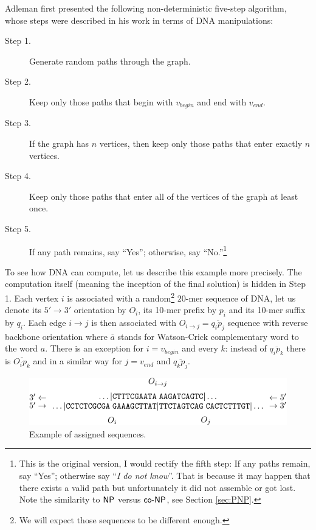 		Adleman first presented the following non-deterministic five-step algorithm, whose steps were described in his work in terms of DNA manipulations:
		\begin{description}
			\item[Step 1.] Generate random paths through the graph.
			\item[Step 2.] Keep only those paths that begin with $v_{begin}$ and end with $v_{end}$.
			\item[Step 3.] If the graph has $n$ vertices, then keep only those paths that enter exactly $n$ vertices.
			\item[Step 4.] Keep only those paths that enter all of the vertices of the graph at least once.
			\item[Step 5.] If any path remains, say ``Yes''; otherwise, say ``No.''\footnote{This is the original version, I would rectify the fifth step: If any paths remain, say ``Yes''; otherwise say ``{\em I do not know}''. That is because it may happen that there exists a valid path but unfortunately it did not assemble or got lost. Note the similarity to $\mathsf{NP}$ versus $\mathsf{co}\textnormal{-}\mathsf{NP}$, see Section \ref{sec:PNP}.} %
		\end{description}
		To see %
		how DNA can compute, let us describe this example more precisely. The computation itself (meaning the inception of the final solution) is hidden in Step 1. Each vertex $i$ is associated with a random\footnote{We will expect those sequences to be different enough.} $20$-mer sequence of DNA, let us denote its $5'\rightarrow 3'$ orientation by $O_i$, its 10-mer prefix by $p_i$ and its 10-mer suffix by $q_i$. Each edge $i\rightarrow j$ is then associated with $O_{i\rightarrow j} = \overline{q_i p_j}$ sequence with reverse backbone orientation where $\overline{a}$ stands for Watson-Crick complementary word to the word $a$. There is an exception for $i=v_{begin}$ and every $k$: instead of $\overline{q_i p_k}$ there is $\overline{O_i p_k}$ and in a similar way for $j=v_{end}$ and $\overline{q_k p_j}$.
		
		\begin{figure}[H]
		\begin{center}
			\includegraphics{./figures/adleman_strands.pdf}
			\caption{Example of assigned sequences.}
			\label{fig:adleman_strands}
		\end{center}
		\end{figure}
		
